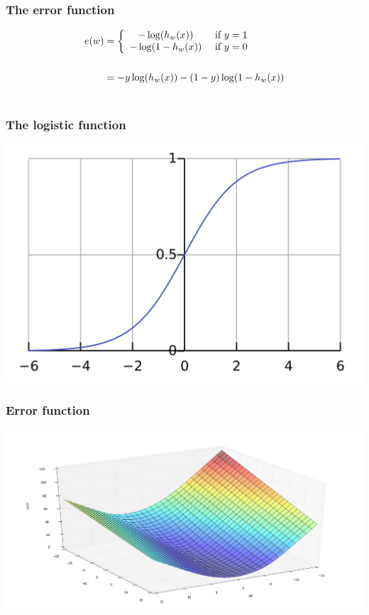   \begin{frame}
    \frametitle{The error function}
    \begin{center}
      \begin{equation*}
        \begin{split}
          e(w) & =
          \left \{
            \begin{array}{cl}
              -\log(h_w(x)) & $ if $ y = 1\\
              -\log(1 - h_w(x)) & $ if $ y = 0
            \end{array}
            \right.\\~\\
            & = -y \log(h_w(x)) - (1 - y) \log(1 - h_w(x))\\~\\
          \end{split}
        \end{equation*}
      \end{center}
    \end{frame}

    \begin{frame}
      \frametitle{The logistic function}
      \begin{center}
        \includegraphics[scale=0.14]{./pictures/sigmoid.png}
      \end{center}
    \end{frame}

    \begin{frame}
      \frametitle{Error function}
      \begin{center}
        \includegraphics[scale=0.22]{./pictures/error_function.png}
      \end{center}
    \end{frame}


